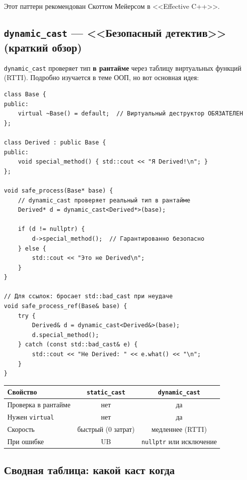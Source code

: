 \documentclass[a4paper,12pt]{article}
\begin{document}
Этот паттерн рекомендован Скоттом Мейерсом в <<Effective C++>>.

\subsection{\texttt{dynamic\_cast} --- <<Безопасный детектив>> (краткий обзор)}

\texttt{dynamic\_cast} проверяет тип \textbf{в рантайме} через таблицу виртуальных
функций (RTTI). Подробно изучается в теме ООП, но вот основная идея:

\begin{lstlisting}
class Base {
public:
    virtual ~Base() = default;  // Виртуальный деструктор ОБЯЗАТЕЛЕН
};

class Derived : public Base {
public:
    void special_method() { std::cout << "Я Derived!\n"; }
};

void safe_process(Base* base) {
    // dynamic_cast проверяет реальный тип в рантайме
    Derived* d = dynamic_cast<Derived*>(base);

    if (d != nullptr) {
        d->special_method();  // Гарантированно безопасно
    } else {
        std::cout << "Это не Derived\n";
    }
}

// Для ссылок: бросает std::bad_cast при неудаче
void safe_process_ref(Base& base) {
    try {
        Derived& d = dynamic_cast<Derived&>(base);
        d.special_method();
    } catch (const std::bad_cast& e) {
        std::cout << "Не Derived: " << e.what() << "\n";
    }
}
\end{lstlisting}

\begin{center}
\begin{tabular}{lcc}
\toprule
\textbf{Свойство} & \texttt{static\_cast} & \texttt{dynamic\_cast} \\
\midrule
Проверка в рантайме   & нет  & да \\
Нужен \texttt{virtual} & нет  & да \\
Скорость              & быстрый (0 затрат) & медленнее (RTTI) \\
При ошибке            & UB   & \texttt{nullptr} или исключение \\
\bottomrule
\end{tabular}
\end{center}

\subsection{Сводная таблица: какой каст когда}
\end{document}
